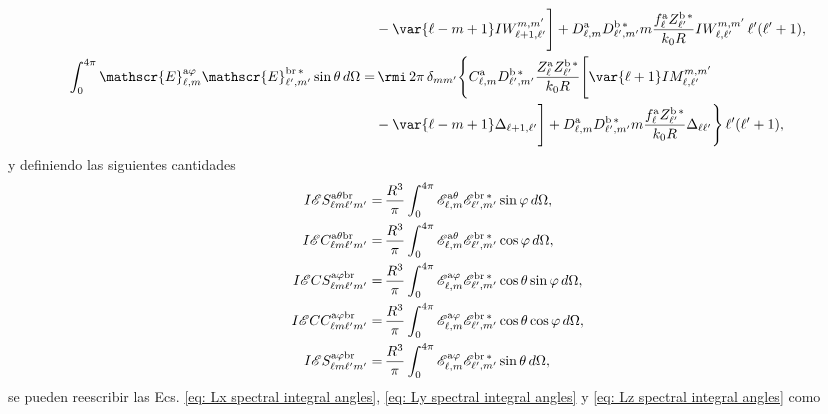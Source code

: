 \begin{align}
% 
&-\var{\ell - m +1} IW_{\ell + 1, \ell^{\prime}}^{m, m^{\prime}} \Bigg]
%
 + D_{\ell, m}^{\rm a} D_{\ell^{\prime}, m^{\prime}}^{\rm b \, *} m \frac{f_{\ell}^{\rm a} Z_{\ell^{\prime}}^{\rm b\, *}}{k_0 R} IW_{\ell, \ell^{\prime}}^{m, m^{\prime}} \, \ell^{\prime}(\ell^{\prime}+1),\\
%
%
%
\int_0^{4\pi}\mathscr{E}_{\ell, m}^{\text{a}\varphi}\mathscr{E}_{\ell^{\prime}, m^{\prime}}^{\text{br}\,*}\sin\theta \, d\Omega
%
 =& \, \rmi \, 2\pi \, \delta_{m m^{\prime}} \Bigg\{ C_{\ell, m}^{\rm a} D_{\ell^{\prime}, m^{\prime}}^{\rm b \, *} \frac{Z_{\ell}^{\rm a} Z_{\ell^{\prime}}^{\rm b \, *}}{k_0 R} \Bigg[\var{\ell +1} IM_{\ell, \ell^{\prime}}^{m, m^{\prime}} \nonumber \\ 
% 
&-\var{\ell - m +1} \Delta_{\ell + 1, \ell^{\prime}}  \Bigg]
%
+ D_{\ell, m}^{\rm a} D_{\ell^{\prime}, m^{\prime}}^{\rm b \, *} m \frac{f_{\ell}^{\rm a} Z_{\ell^{\prime}}^{\rm b\, *}}{k_0 R} \Delta_{\ell \ell^{\prime}} \Bigg\} \, \ell^{\prime}(\ell^{\prime}+1),
\end{align}
y definiendo las siguientes cantidades
\begin{align}
I\mathscr{E}S_{\ell m \ell^{\prime} m^{\prime}}^{\rm a \theta b r} 
=& \, \frac{R^3}{\pi} \int_{0}^{4\pi} \mathscr{E}_{\ell, m}^{\text{a}\theta}\mathscr{E}_{\ell^{\prime}, m^{\prime}}^{\text{br}\,*} \sin\varphi \, d\Omega ,
\\
%
%
%
I\mathscr{E}C_{\ell m \ell^{\prime} m^{\prime}}^{\rm a \theta b r} 
=& \, \frac{R^3}{\pi} \int_{0}^{4\pi} \mathscr{E}_{\ell, m}^{\text{a}\theta}\mathscr{E}_{\ell^{\prime}, m^{\prime}}^{\text{br}\,*} \cos\varphi \, d\Omega,
\\
%
%
%
I\mathscr{E}CS_{\ell m \ell^{\prime} m^{\prime}}^{\rm a \varphi b r}
=& \, \frac{R^3}{\pi} \int_0^{4\pi}\mathscr{E}_{\ell, m}^{\text{a}\varphi}\mathscr{E}_{\ell^{\prime}, m^{\prime}}^{\text{br}\,*}\cos\theta\sin\varphi \, d\Omega,  \\
%
%
%
I\mathscr{E}CC_{\ell m \ell^{\prime} m^{\prime}}^{\rm a \varphi b r}
 =& \, \frac{R^3}{\pi} \int_0^{4\pi}\mathscr{E}_{\ell, m}^{\text{a}\varphi}\mathscr{E}_{\ell^{\prime}, m^{\prime}}^{\text{br}\,*}\cos\theta\cos\varphi \, d\Omega, \\
%
%
%
I\mathscr{E}S_{\ell m \ell^{\prime} m^{\prime}}^{\rm a \varphi b r}
 =& \, \frac{R^3}{\pi} \int_0^{4\pi}\mathscr{E}_{\ell, m}^{\text{a}\varphi}\mathscr{E}_{\ell^{\prime}, m^{\prime}}^{\text{br}\,*}\sin\theta \, d\Omega ,
\end{align}
se pueden reescribir las Ecs. \eqref{eq: Lx spectral integral angles}, \eqref{eq: Ly spectral integral angles} y \eqref{eq: Lz spectral integral angles} como 
